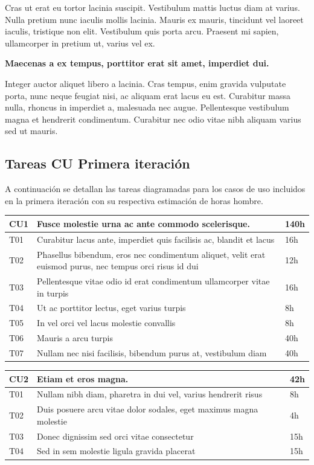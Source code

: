 \documentclass[a4paper, 10pt, twoside]{article}
\begin{document}
Cras ut erat eu tortor lacinia suscipit. Vestibulum mattis luctus diam at varius. Nulla pretium nunc iaculis mollis lacinia. Mauris ex mauris, tincidunt vel laoreet iaculis, tristique non elit. Vestibulum quis porta arcu. Praesent mi sapien, ullamcorper in pretium ut, varius vel ex.

\textbf{Maecenas a ex tempus, porttitor erat sit amet, imperdiet dui.}

Integer auctor aliquet libero a lacinia. Cras tempus, enim gravida vulputate porta, nunc neque feugiat nisi, ac aliquam erat lacus eu est. Curabitur massa nulla, rhoncus in imperdiet a, malesuada nec augue. Pellentesque vestibulum magna et hendrerit condimentum. Curabitur nec odio vitae nibh aliquam varius sed ut mauris.

\subsection{Tareas CU Primera iteración}
A continuación se detallan las tareas diagramadas para los casos de uso incluidos en la primera iteración con su respectiva estimación de horas hombre.
\\

\begin{tabular}{lp{13cm}l}
  \hline
  CU1 & Fusce molestie urna ac ante commodo scelerisque. & 140h \\
  \hline
  T01 & Curabitur lacus ante, imperdiet quis facilisis ac, blandit et lacus & 16h \\
  T02 & Phasellus bibendum, eros nec condimentum aliquet, velit erat euismod purus, nec tempus orci risus id dui & 12h \\
  T03 & Pellentesque vitae odio id erat condimentum ullamcorper vitae in turpis & 16h \\
  T04 & Ut ac porttitor lectus, eget varius turpis & 8h \\
  T05 & In vel orci vel lacus molestie convallis & 8h \\
  T06 & Mauris a arcu turpis & 40h\\
  T07 & Nullam nec nisi facilisis, bibendum purus at, vestibulum diam & 40h \\
  \hline
\end{tabular}

\vspace{1em}

\begin{tabular}{lp{13cm}l}
  \hline
  CU2 & Etiam et eros magna. & 42h \\
  \hline
  T01 & Nullam nibh diam, pharetra in dui vel, varius hendrerit risus & 8h \\
  T02 & Duis posuere arcu vitae dolor sodales, eget maximus magna molestie & 4h \\
  T03 & Donec dignissim sed orci vitae consectetur & 15h \\
  T04 & Sed in sem molestie ligula gravida placerat & 15h \\
  \hline
\end{tabular}
\end{document}
